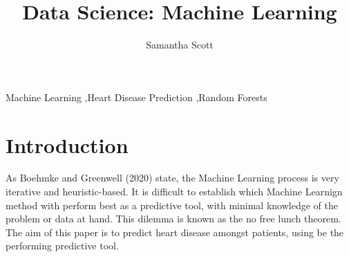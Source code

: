 \documentclass[11pt,preprint, authoryear]{elsarticle}
\numberwithin{equation}{section}
\numberwithin{figure}{section}
\numberwithin{table}{section}
\begin{document}
\begin{frontmatter}  %

\title{Data Science: Machine Learning}





\author[Add1]{Samantha Scott}





\address[Add1]{Stellenbosch University, Cape Town, South Africa}



\vspace{1cm}


\begin{keyword}
\footnotesize{
Machine Learning \sep Heart Disease Prediction \sep Random Forests \\
\vspace{0.3cm}
}
\end{keyword}



\vspace{0.5cm}

\end{frontmatter}


\newpage
\renewcommand{\contentsname}{Table of Contents}
{\tableofcontents}
\newpage

\pagestyle{fancy}
\chead{}
\lfoot{}
\lhead{}
\cfoot{}


\headsep 35pt %




\hypertarget{introduction}{%
\section{Introduction}\label{introduction}}

As Boehmke and Greenwell (2020) state, the Machine Learning process is
very iterative and heuristic-based. It is difficult to establish which
Machine Learnign method with perform best as a predictive tool, with
minimal knowledge of the problem or data at hand. This dilemma is known
as the no free lunch theorem. The aim of this paper is to predict heart
disease amongst patients, using be the performing predictive tool.
\end{document}
